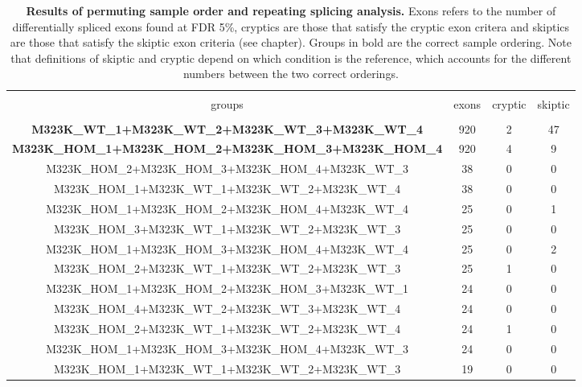 
\begin{table}[!htbp] \centering 
	
	\footnotesize
	\caption[Results of permuting sample order and repeating splicing analysis]{
		\textbf{Results of permuting sample order and repeating splicing analysis.} Exons refers to the number of differentially spliced exons found at FDR 5\%, cryptics are those that satisfy the cryptic exon critera and skiptics are those that satisfy the skiptic exon criteria (see chapter). Groups in bold are the correct sample ordering. Note that definitions of skiptic and cryptic depend on which condition is the reference, which accounts for the different numbers between the two correct orderings. 
	} 
	\label{append:permutations} 
	\begin{tabular}{@{\extracolsep{5pt}} cccc} 
		\\[-1.8ex]\hline 
		\hline \\[-1.8ex] 
		groups & exons & cryptic & skiptic \\ 
		\hline \\[-1.8ex] 
		\textbf{M323K\_WT\_1+M323K\_WT\_2+M323K\_WT\_3+M323K\_WT\_4} & 920 & 2 & 47 \\ 
		\textbf{M323K\_HOM\_1+M323K\_HOM\_2+M323K\_HOM\_3+M323K\_HOM\_4} & 920 & 4 & 9 \\ 
		M323K\_HOM\_2+M323K\_HOM\_3+M323K\_HOM\_4+M323K\_WT\_3 & 38 & 0 & 0 \\ 
		M323K\_HOM\_1+M323K\_WT\_1+M323K\_WT\_2+M323K\_WT\_4 & 38 & 0 & 0 \\ 
		M323K\_HOM\_1+M323K\_HOM\_2+M323K\_HOM\_4+M323K\_WT\_4 & 25 & 0 & 1 \\ 
		M323K\_HOM\_3+M323K\_WT\_1+M323K\_WT\_2+M323K\_WT\_3 & 25 & 0 & 0 \\ 
		M323K\_HOM\_1+M323K\_HOM\_3+M323K\_HOM\_4+M323K\_WT\_4 & 25 & 0 & 2 \\ 
		M323K\_HOM\_2+M323K\_WT\_1+M323K\_WT\_2+M323K\_WT\_3 & 25 & 1 & 0 \\ 
		M323K\_HOM\_1+M323K\_HOM\_2+M323K\_HOM\_3+M323K\_WT\_1 & 24 & 0 & 0 \\ 
		M323K\_HOM\_4+M323K\_WT\_2+M323K\_WT\_3+M323K\_WT\_4 & 24 & 0 & 0 \\ 
		M323K\_HOM\_2+M323K\_WT\_1+M323K\_WT\_2+M323K\_WT\_4 & 24 & 1 & 0 \\ 
		M323K\_HOM\_1+M323K\_HOM\_3+M323K\_HOM\_4+M323K\_WT\_3 & 24 & 0 & 0 \\ 
		M323K\_HOM\_1+M323K\_WT\_1+M323K\_WT\_2+M323K\_WT\_3 & 19 & 0 & 0 \\ 

\end{tabular}
\end{table}
